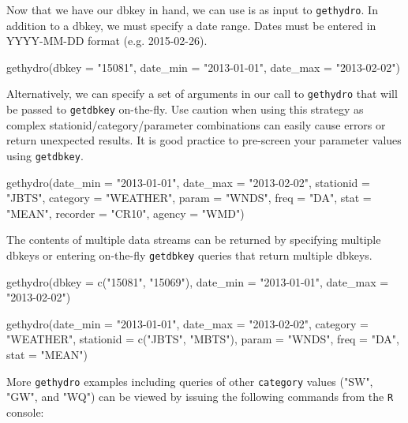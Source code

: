 \documentclass[12pt,notitlepage]{article}
\begin{document}
\noindent Now that we have our dbkey in hand, we can use is as input to \texttt{gethydro}. In addition to a dbkey, we must specify a date range. Dates must be entered in YYYY-MM-DD format (e.g. 2015-02-26).

\begin{Schunk}
\begin{Sinput}
 gethydro(dbkey = "15081",
          date_min = "2013-01-01", date_max = "2013-02-02")
\end{Sinput}
\end{Schunk}

\noindent Alternatively, we can specify a set of arguments in our call to \texttt{gethydro} that will be passed to \texttt{getdbkey} on-the-fly. Use caution when using this strategy as complex stationid/category/parameter combinations can easily cause errors or return unexpected results. It is good practice to pre-screen your parameter values using \texttt{getdbkey}.

\begin{Schunk}
\begin{Sinput}
 gethydro(date_min = "2013-01-01", date_max = "2013-02-02",
          stationid = "JBTS", category = "WEATHER", param = "WNDS",
          freq = "DA", stat = "MEAN", recorder = "CR10", agency = "WMD")
\end{Sinput}
\end{Schunk}

\noindent The contents of multiple data streams can be returned by specifying multiple dbkeys or entering on-the-fly \texttt{getdbkey} queries that return multiple dbkeys.

\begin{Schunk}
\begin{Sinput}
 gethydro(dbkey = c("15081", "15069"), date_min = "2013-01-01",
          date_max = "2013-02-02")
\end{Sinput}
\end{Schunk}

\begin{Schunk}
\begin{Sinput}
 gethydro(date_min = "2013-01-01", date_max = "2013-02-02",
          category = "WEATHER", stationid = c("JBTS", "MBTS"),
          param = "WNDS", freq = "DA", stat = "MEAN")
\end{Sinput}
\end{Schunk}

\noindent More \texttt{gethydro} examples including queries of other \texttt{category} values ("SW", "GW", and "WQ") can be viewed by issuing the following commands from the \texttt{R} console:
\end{document}
